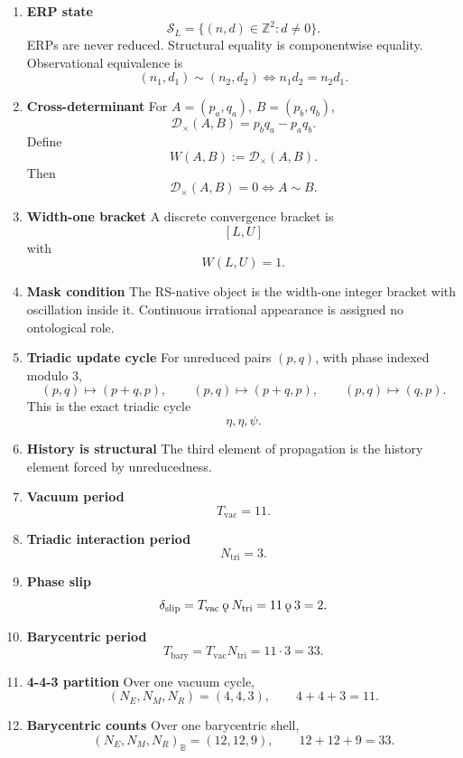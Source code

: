 \documentclass[11pt,letterpaper]{article}
\theoremstyle{plain}
\theoremstyle{definition}
\theoremstyle{remark}
\newcommand{\koppa}{\mathbin{\text{\rm\k{o}}}}
\begin{document}
\begin{enumerate}
\item \textbf{ERP state}
\[
\mathcal S_L=\{(n,d)\in \mathbb Z^2:d\neq 0\}.
\]
ERPs are never reduced. Structural equality is componentwise equality. Observational equivalence is
\[
(n_1,d_1)\sim(n_2,d_2)\iff n_1d_2=n_2d_1.
\]

\item \textbf{Cross-determinant}
For \(A=(p_a,q_a)\), \(B=(p_b,q_b)\),
\[
\mathcal D_\times(A,B)=p_bq_a-p_aq_b.
\]
Define
\[
W(A,B):=\mathcal D_\times(A,B).
\]
Then
\[
\mathcal D_\times(A,B)=0 \iff A\sim B.
\]

\item \textbf{Width-one bracket}
A discrete convergence bracket is
\[
[L,U]
\]
with
\[
W(L,U)=1.
\]

\item \textbf{Mask condition}
The RS-native object is the width-one integer bracket with oscillation inside it. Continuous irrational appearance is assigned no ontological role.

\item \textbf{Triadic update cycle}
For unreduced pairs \((p,q)\), with phase indexed modulo \(3\),
\[
(p,q)\mapsto(p+q,p),\qquad (p,q)\mapsto(p+q,p),\qquad (p,q)\mapsto(q,p).
\]
This is the exact triadic cycle
\[
\eta,\eta,\psi.
\]

\item \textbf{History is structural}
The third element of propagation is the history element forced by unreducedness.

\item \textbf{Vacuum period}
\[
T_{\mathrm{vac}}=11.
\]

\item \textbf{Triadic interaction period}
\[
N_{\mathrm{tri}}=3.
\]

\item \textbf{Phase slip}
\[
\delta_{\mathrm{slip}}=T_{\mathrm{vac}}\koppa N_{\mathrm{tri}}=11\koppa 3=2.
\]

\item \textbf{Barycentric period}
\[
T_{\mathrm{bary}}=T_{\mathrm{vac}}N_{\mathrm{tri}}=11\cdot 3=33.
\]

\item \textbf{4-4-3 partition}
Over one vacuum cycle,
\[
(N_E,N_M,N_R)=(4,4,3),
\qquad
4+4+3=11.
\]

\item \textbf{Barycentric counts}
Over one barycentric shell,
\[
(N_E,N_M,N_R)_{\mathbb B}=(12,12,9),
\qquad
12+12+9=33.
\]
\end{enumerate}
\end{document}
